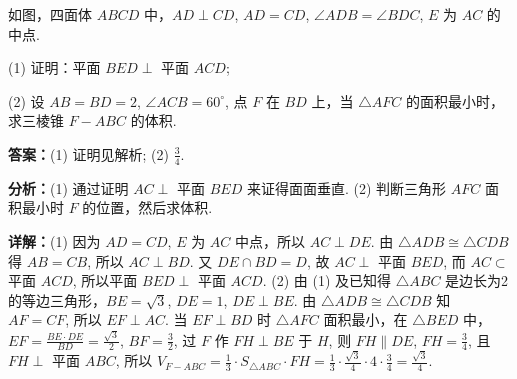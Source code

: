 \begin{question}[points=12]
如图，四面体 $ABCD$ 中，$AD\perp CD$, $AD=CD$, $\angle ADB = \angle BDC$, $E$ 为 $AC$ 的中点.

(1) 证明：平面 $BED \perp$ 平面 $ACD$;

(2) 设 $AB=BD=2$, $\angle ACB=60^\circ$, 点 $F$ 在 $BD$ 上，当 $\triangle AFC$ 的面积最小时，求三棱锥 $F-ABC$ 的体积.
\begin{solution}
\textbf{答案：}(1) 证明见解析; (2) $\frac{3}{4}$.

\textbf{分析：}(1) 通过证明 $AC\perp$ 平面 $BED$ 来证得面面垂直.
(2) 判断三角形 $AFC$ 面积最小时 $F$ 的位置，然后求体积.

\textbf{详解：}(1) 因为 $AD=CD$, $E$ 为 $AC$ 中点，所以 $AC\perp DE$. 由 $\triangle ADB \cong \triangle CDB$ 得 $AB=CB$, 所以 $AC\perp BD$. 又 $DE\cap BD=D$, 故 $AC\perp$ 平面 $BED$, 而 $AC\subset$ 平面 $ACD$, 所以平面 $BED \perp$ 平面 $ACD$.
(2) 由 (1) 及已知得 $\triangle ABC$ 是边长为2的等边三角形，$BE=\sqrt{3}$, $DE=1$, $DE\perp BE$. 由 $\triangle ADB\cong\triangle CDB$ 知 $AF=CF$, 所以 $EF\perp AC$. 当 $EF\perp BD$ 时 $\triangle AFC$ 面积最小，在 $\triangle BED$ 中，$EF=\frac{BE\cdot DE}{BD}=\frac{\sqrt{3}}{2}$, $BF=\frac{3}{2}$, 过 $F$ 作 $FH\perp BE$ 于 $H$, 则 $FH\parallel DE$, $FH=\frac{3}{4}$, 且 $FH\perp$ 平面 $ABC$, 所以 $V_{F-ABC}=\frac13\cdot S_{\triangle ABC}\cdot FH = \frac13\cdot\frac{\sqrt{3}}{4}\cdot4\cdot\frac34 = \frac{\sqrt{3}}{4}$.
\end{solution}
\end{question}

